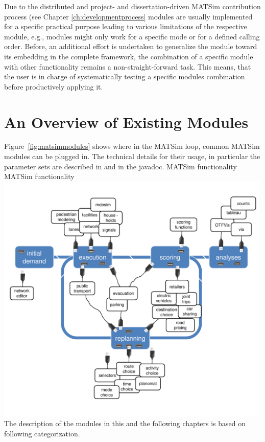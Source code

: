 Due to the distributed and project- and dissertation-driven MATSim contribution process (see Chapter \ref{ch:developmentprocess} modules are usually implemented for a specific practical purpose leading to various limitations of the respective module, e.g., modules might only work for a specific mode or for a defined calling order. Before, an additional effort is undertaken to generalize the module toward its embedding in the complete framework, the combination of a specific module with other functionality remains a non-straight-forward task. This means, that the user is in charge of systematically testing a specific modules combination before productively applying it.

\section{An Overview of Existing Modules}
Figure~\ref{fig:matsimmodules} shows where in the MATSim loop, common MATSim modules can be plugged in. The technical details for their usage, in particular the parameter sets are described in \citep[][]{MATSim_Userguide_2014} and in the javadoc.
%
\createfigure%
{MATSim functionality}%
{MATSim functionality}%
{\label{fig:matsimmodules}}%
{\includegraphics[width=0.99\textwidth, angle=0]{extending/figures/modules.pdf}}%
{}
%
The description of the modules in this and the following chapters is based on following categorization.
